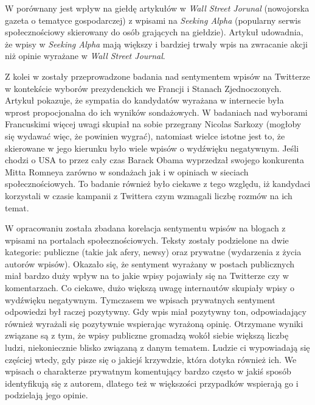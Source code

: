 W \cite{SentimentRevealedInSocialMedia} porównany jest wpływ na giełdę artykułów
w \textit{Wall Street Jorunal} (nowojorska gazeta o tematyce gospodarczej) z
wpisami na \textit{Seeking Alpha} (popularny serwis społecznościowy skierowany
do osób grających na giełdzie). Artykuł udowadnia, że wpisy w \textit{Seeking
Alpha} mają większy i bardziej trwały wpis na zwracanie akcji niż opinie
wyrażane w \textit{Wall Street Journal}.

Z kolei w \cite{PresidentialElectionsOnTwitter} zostały przeprowadzone badania
nad sentymentem wpisów na Twitterze w kontekście wyborów prezydenckich we
Francji i Stanach Zjednoczonych.
Artykuł pokazuje, że sympatia do kandydatów wyrażana w internecie była wprost
propocjonalna do ich wyników sondażowych. W badaniach nad wyborami Francuskimi
więcej uwagi skupiał na sobie przegrany Nicolas Sarkozy (mogłoby się wydawać
więc, że powinien wygrać), natomiast wielce istotne jest to, że skierowane w
jego kierunku było wiele wpisów o wydźwięku negatywnym. Jeśli chodzi o USA to
przez cały czas Barack Obama wyprzedzał swojego konkurenta Mitta Romneya zarówno
w sondażach jak i w opiniach w sieciach społecznościowych. To badanie również
było ciekawe z tego względu, iż kandydaci korzystali w czasie kampanii z
Twittera czym wzmagali liczbę rozmów na ich temat.

W opracowaniu \cite{AnalyzingSentimentialInfluenceOfPosts} została zbadana
korelacja sentymentu wpisów na blogach z wpisami na portalach społecznościowych.
Teksty zostały podzielone na dwie kategorie:
publiczne (takie jak afery, newsy) oraz prywatne (wydarzenia z życia autorów
wpisów).
Okazało się, że sentyment wyrażany w postach publicznych miał bardzo duży wpływ
na to jakie wpisy pojawiały się na Twitterze czy w komentarzach. Co ciekawe,
dużo większą uwagę internautów skupiały wpisy o wydźwięku negatywnym.
Tymczasem we wpisach prywatnych sentyment odpowiedzi był raczej pozytywny. Gdy
wpis miał pozytywny ton, odpowiadający również wyrażali się pozytywnie
wspierając wyrażoną opinię.
Otrzymane wyniki związane są z tym, że wpisy publiczne gromadzą
wokół siebie większą liczbę ludzi, niekoniecznie blisko związaną z danym
tematem. Ludzie ci wypowiadają się częściej wtedy, gdy pisze się o jakiejś
krzywdzie, która dotyka również ich.
We wpisach o charakterze prywatnym komentujący bardzo często w jakiś sposób
identyfikują się z autorem, dlatego też w większości przypadków wspierają go i
podzielają jego opinie.

